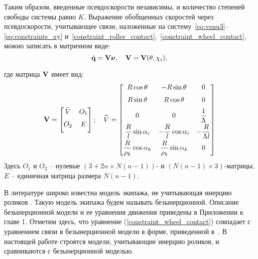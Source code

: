 Таким образом, введенные псевдоскорости независимы, и количество степеней свободы системы равно $K$. Выражение обобщенных скоростей через псевдоскорости, учитывающее связи, наложенные на систему~\eqref{eq:vsnu3}--\eqref{eq:constraints_xy} и~\eqref{constraint_roller_contact},~\eqref{constraint_wheel_contact}, можно записать в матричном виде:
\begin{equation}\label{constraints_V}
    \dot{\boldsymbol{\mathbf{q}}} = \mathbf{V}\boldsymbol{\mathbf{\nu}},\quad \mathbf{V} = \mathbf{V}(\theta,\chi_i),
\end{equation}

где матрица $\mathbf{V}$ имеет вид:
$$
\mathbf{V} = \begin{bmatrix}
        \widetilde{V}  & O_1  \\[6pt]
        O_2       & E         \\[6pt]
    \end{bmatrix};
\quad
\widetilde{V} = \begin{bmatrix}
        R\cos\theta                    & -R\sin\theta                    & 0                      \\[6pt]
        R\sin\theta                    &  R\cos\theta                    & 0                      \\[6pt]
        0                              & 0                               & \displaystyle\frac{\displaystyle 1}{\displaystyle \Lambda}    \\[6pt]
        \displaystyle\frac{\displaystyle R}{\displaystyle l}\sin\alpha_i      & -\displaystyle\frac{\displaystyle R}{\displaystyle l}\cos\alpha_i      & -\displaystyle\frac{\displaystyle R}{\displaystyle \Lambda l} \\[6pt]
        \displaystyle\frac{\displaystyle R}{\displaystyle \rho_k}\cos\alpha_k &  \displaystyle\frac{\displaystyle R}{\displaystyle \rho_k}\sin\alpha_k & 0                      \\[6pt]
    \end{bmatrix}
$$
Здесь $O_1$ и $O_2$ -- нулевые $(3+2n \times N(n-1))$- и $(N(n-1) \times 3)$-матрицы, $E$ -- единичная матрица размера $N(n-1)$.

\vspace{15pt}

В литературе широко известна модель экипажа, не учитывающая инерцию роликов \cite{ZobovaTatarinovAspecty2006,zobova2008svobodnye8020851,ZobovaTatarinovPMM,Zobova2011,MartynenkoFormalskii2007,formalskii,Martynenko2010_rus,Borisov2011KilinBobykin2014}. Такую модель экипажа будем называть безынерционной. Описание безынерционной модели и ее уравнения движения приведены в Приложении к главе 1. Отметим здесь, что уравнение (\ref{constraint_wheel_contact}) совпадает с уравнением связи в безынерционной модели в форме, приведенной в~\cite{Zobova2011}. В настоящей работе строятся модели, учитывающие инерцию роликов, и сравниваются с безынерционной моделью.
